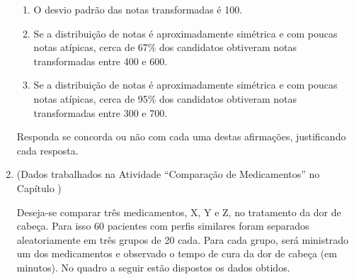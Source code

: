 \begin{enumerate}
\begin{enumerate}
\item {} 
O desvio padrão das notas transformadas é 100.

\item {} 
Se a distribuição de notas é aproximadamente simétrica e com poucas notas atípicas, cerca de 67\% dos candidatos obtiveram notas transformadas entre 400 e 600.

\item {} 
Se a distribuição de notas é aproximadamente simétrica e com poucas notas atípicas, cerca de 95\% dos candidatos obtiveram notas transformadas entre 300 e 700.

\end{enumerate}

Responda se concorda ou não com cada uma destas afirmações, justificando cada resposta.

\item (Dados trabalhados na Atividade “Comparação de Medicamentos” no Capítulo )

Deseja-se comparar três medicamentos, X, Y e Z, no tratamento da dor de cabeça. Para isso 60 pacientes com perfis similares foram separados aleatoriamente em três grupos de 20 cada. Para cada grupo,  será ministrado um dos medicamentos e observado o tempo de cura da dor de cabeça (em minutos). No quadro a seguir estão dispostos os dados obtidos.
\begin{quote}


\begin{savenotes}\sphinxattablestart
\centering
{}
\label{\detokenize{PE104-E:tabela-medicamentos}}\label{\detokenize{PE104-E:id10}}
\sphinxaftercaption
\begin{tabulary}{\linewidth}[t]{|T|T|T|T|}
\hline


\end{tabulary}
\end{savenotes}
\end{quote}
\end{enumerate}
